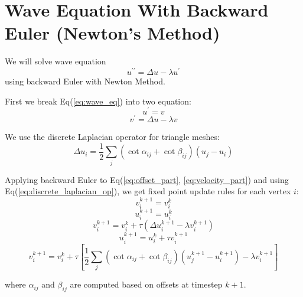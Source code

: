 \documentclass{article}
\begin{document}
\section*{Wave Equation With Backward Euler (Newton's Method)}
We will solve wave equation 
\begin{equation} \label{eq:wave_eq}
u^{\prime\prime} = \Delta u - \lambda u^{\prime}
\end{equation}
using backward Euler with Newton Method.

First we break Eq(\ref{eq:wave_eq}) into two equation:
\begin{equation}\label{eq:offset_part}
u^{\prime} = v
\end{equation}
\begin{equation}\label{eq:velocity_part}
v^{\prime} = \Delta u - \lambda v
\end{equation}

We use the discrete Laplacian operator for triangle meshes:
\begin{equation} \label{eq:discrete_laplacian_op}
\Delta u_i = \frac{1}{2}\sum_{j} (\cot{\alpha_{ij}} + \cot{\beta_{ij}})(u_j - u_i)
\end{equation}

Applying backward Euler to Eq(\ref{eq:offset_part}, \ref{eq:velocity_part}) and using Eq(\ref{eq:discrete_laplacian_op}), we get fixed point update rules for each vertex $i$:
\begin{equation}\label{eq:initialization_velocity}
v_i^{k+1} = v_i^{k}
\end{equation}
\begin{equation}\label{eq:initialization_offset}
u_i^{k+1} = u_i^{k}
\end{equation}
\begin{equation}\label{eq:update_velocity}
v_i^{k+1} = v_i^{k} + \tau (\Delta u_i^{k+1} - \lambda v_i^{k+1})
\end{equation}
\begin{equation}\label{eq:update_offset}
u_i^{k+1} = u_i^{k} + \tau v_i^{k+1}
\end{equation}
\begin{equation}\label{eq:update_velocity_subs}
v_i^{k+1} = v_i^{k} + \tau \left[\frac{1}{2}\sum_{j} (\cot\alpha_{ij}+\cot\beta_{ij})(u_j^{k+1} - u_i^{k+1}) - \lambda v_i^{k+1}\right]
\end{equation}

where $\alpha_{ij}$ and $\beta_{ij}$ are computed based on offsets at timestep $k+1$.
\end{document}
